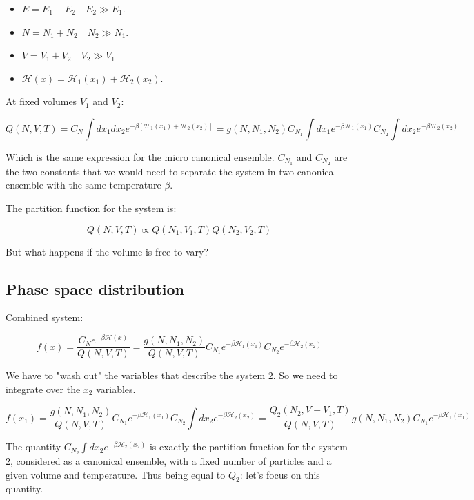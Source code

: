 \begin{multicols}{2}
	\begin{itemize}
		\item $E = E_1 + E_2\quad E_2\gg E_1$.
		\item $N = N_1 + N_2\quad N_2\gg N_1$.
		\item $V = V_1 + V_2\quad V_2\gg V_1$
		\item $\mathcal{H}(x) = \mathcal{H}_1(x_1) + \mathcal{H}_2(x_2)$.
	\end{itemize}
\end{multicols}


At fixed volumes $V_1$ and $V_2$:

$$Q(N, V, T) = C_N\int dx_1dx_2 e^{-\beta[\mathcal{H}_1(x_1) + \mathcal{H}_2(x_2)]} = g(N, N_1, N_2)C_{N_1}\int dx_1 e^{-\beta\mathcal{H}_1(x_1)}C_{N_2}\int dx_2 e^{-\beta\mathcal{H}_2(x_2)}$$

Which is the same expression for the micro canonical ensemble. $C_{N_1}$ and $C_{N_2}$ are the two constants that we would need to separate the system in two canonical ensemble with the same temperature $\beta$. 

The partition function for the system is: 

$$Q(N, V, T) \propto Q(N_1, V_1, T)Q(N_2, V_2, T)$$

But what happens if the volume is free to vary?

	\subsection{Phase space distribution}
	Combined system:

	$$f(x) = \frac{C_Ne^{-\beta\mathcal{H}(x)}}{Q(N, V, T)} = \frac{g(N, N_1, N_2)}{Q(N, V, T)}C_{N_1}e^{-\beta\mathcal{H}_1(x_1)}C_{N_2}e^{-\beta\mathcal{H}_2(x_2)}$$

We have to "wash out" the variables that describe the system $2$. So we need to integrate over the $x_2$ variables. 

	$$f(x_1) = \frac{g(N, N_1, N_2)}{Q(N, V, T)}C_{N_1}e^{-\beta\mathcal{H}_1(x_1)}C_{N_2}\int dx_2 e^{-\beta\mathcal{H}_2(x_2)} = \frac{Q_2(N_2, V-V_1, T)}{Q(N, V, T)}g(N, N_1, N_2)C_{N_1}e^{-\beta\mathcal{H}_1(x_1)}$$
	
	The quantity $C_{N_2}\int dx_2 e^{-\beta\mathcal{H}_2(x_2)}$ is exactly the partition function for the system $2$, considered as a canonical ensemble, with a fixed number of particles and a given volume and temperature. Thus being equal to $Q_2$: let's focus on this quantity. 

